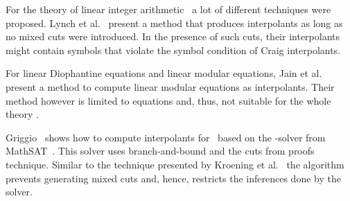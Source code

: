 \begin{techreport}
For the theory of linear integer arithmetic \laz\ a lot of
different techniques were proposed.  Lynch et
al.~\cite{DBLP:conf/atva/LynchT08} present a method that produces interpolants
as long as no mixed cuts were introduced.  In the presence of such cuts, their
interpolants might contain symbols that violate the symbol condition of Craig
interpolants.

For linear Diophantine equations and linear modular equations, Jain et
al.~\cite{DBLP:journals/fmsd/JainCG09} present a method to compute linear
modular equations as interpolants. Their method however is limited to
equations and, thus, not suitable for the whole theory \laz.

Griggio~\cite{Griggio2011} shows how to compute interpolants for \laz\ based
on the \laz-solver from MathSAT~\cite{Griggio2012}. This solver uses
branch-and-bound and the cuts from proofs~\cite{Dillig2011} technique. Similar
to the technique presented by Kroening et
al.~\cite{DBLP:conf/lpar/KroeningLR10} the algorithm prevents generating mixed
cuts and, hence, restricts the inferences done by the solver.
\end{techreport}
